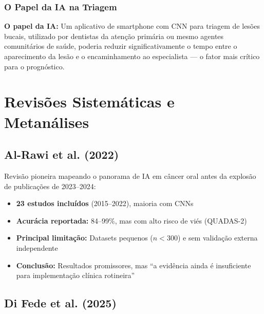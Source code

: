 \subsubsection{O Papel da IA na Triagem}

\textbf{O papel da IA:} Um aplicativo de smartphone com CNN para triagem de lesões
bucais, utilizado por dentistas da atenção primária ou mesmo agentes comunitários
de saúde, poderia reduzir significativamente o tempo entre o aparecimento da lesão
e o encaminhamento ao especialista --- o fator mais crítico para o prognóstico.


\section{Revisões Sistemáticas e Metanálises}
\label{sec:revisoes-cancer}

\subsection{Al-Rawi et al. (2022)}

Revisão pioneira mapeando o panorama de IA em câncer oral antes da explosão de
publicações de 2023--2024:
\begin{itemize}
  \item \textbf{23 estudos incluídos} (2015--2022), maioria com CNNs
  \item \textbf{Acurácia reportada:} 84--99\%, mas com alto risco de viés (QUADAS-2)
  \item \textbf{Principal limitação:} Datasets pequenos ($n < 300$) e sem validação
        externa independente
  \item \textbf{Conclusão:} Resultados promissores, mas ``a evidência ainda é
        insuficiente para implementação clínica rotineira''
\end{itemize}

\subsection{Di Fede et al. (2025)}

